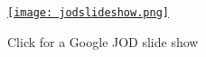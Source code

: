 
\captionsetup[figure]{labelformat=empty}
\begin{figure}[htbp]
\centering
\href{https://docs.google.com/present/edit?id=0AXhRbt360vl5ZGhubXMycDVfMTI5ZnI5amN3aHQ}{\texttt{[image: jodslideshow.png]}}
\caption{Click for a Google JOD slide show}
\label{fig:jodshow}
\end{figure}


%